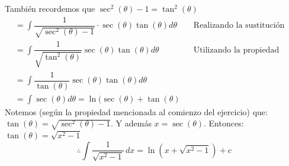 \documentclass[letterpaper]{article}
\renewcommand{\*}{\cdot}
\theoremstyle{definition}
\begin{document}
\begin{enumerate}
\begin{enumerate}
También recordemos que $\sec^{2}(\theta)-1= \tan^{2}(\theta)$
\begin{align*}
	&= \int \dfrac{1}{\sqrt{\sec^{2}(\theta)-1}}\cdot \sec(\theta)\tan(\theta)d\theta &&\text{Realizando la sustitución}\\
	&= \int \dfrac{1}{\sqrt{\tan^{2}(\theta)}}\sec(\theta)\tan(\theta)d\theta &&\text{Utilizando la propiedad anterior}\\
	&= \int \dfrac{1}{\tan(\theta)} \sec(\theta)\tan(\theta)d\theta\\
	&= \int \sec(\theta)d\theta = \ln(\sec(\theta)+\tan(\theta)
\end{align*}
Notemos (según la propiedad mencionada al comienzo del ejercicio) que: $\tan(\theta)= \sqrt{\sec^{2}(\theta)-1}$. Y además $x = \sec(\theta)$. Entonces: $\tan(\theta)=\sqrt{x^{2}-1}$
\[\therefore \int  \dfrac{1}{ \sqrt{x^2 - 1}} \, dx = \ln(x+\sqrt{x^{2}-1})+c\]
\end{enumerate}


\end{enumerate}
\end{document}
